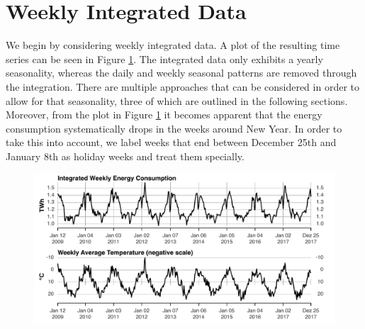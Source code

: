 \documentclass[conference]{IEEEtran}
\begin{document}
\section{Weekly Integrated Data}
We begin by considering weekly integrated data. A plot of the resulting time series can be seen in Figure \ref{weekly}. The integrated data only exhibits a yearly seasonality, whereas the daily and weekly seasonal patterns are removed through the integration. There are multiple approaches that can be considered in order to allow for that seasonality, three of which are outlined in the following sections. Moreover, from the plot in Figure \ref{weekly} it becomes apparent that the energy consumption systematically drops in the weeks around New Year. In order to take this into account, we label weeks that end between December 25th and January 8th as holiday weeks and treat them specially. 

\begin{figure}[ht]
	\centering
	\includegraphics[width=1\textwidth]{Figs/weeklyInt+Temperature.pdf}
	\caption{}
	\label{weekly}
\end{figure}
\end{document}
